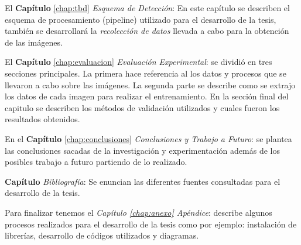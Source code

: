 El \textbf{Capítulo} \ref{chap:tbd} \textit{Esquema de Detección}: En este capítulo se describen el esquema de procesamiento (pipeline) utilizado para el desarrollo de la tesis, también se desarrollará la \textit{recolección de datos} llevada a cabo para la obtención de las imágenes.


El \textbf{Capítulo} \ref{chap:evaluacion} \textit{Evaluación Experimental}:  se  dividió en tres secciones principales. La primera hace referencia al los datos y procesos que se llevaron a cabo sobre las imágenes. La segunda parte se describe como se extrajo los datos de cada imagen para realizar el entrenamiento. En la sección final del capitulo se describen los métodos de validación utilizados y cuales fueron los resultados obtenidos.

En el \textbf{Capítulo} \ref{chap:conclusiones} \textit{Conclusiones y Trabajo a Futuro}: se plantea las conclusiones sacadas de la investigación y experimentación además de los posibles trabajo a futuro partiendo de lo realizado.

\textbf{Capítulo} \textit{Bibliografía}: Se enuncian las diferentes fuentes consultadas para el desarrollo de la tesis.

Para finalizar tenemos el \textit{Capítulo \ref{chap:anexo} Apéndice}: describe algunos procesos realizados para el desarrollo de la tesis como por ejemplo: instalación de librerías, desarrollo de códigos utilizados y diagramas.
